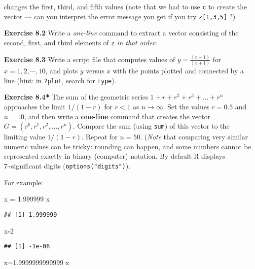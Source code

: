 \documentclass[11pt,]{article}
\newenvironment{Shaded}{\begin{snugshade}}{\end{snugshade}}
\newcommand{\DecValTok}[1]{\textcolor[rgb]{0.00,0.00,0.81}{#1}}
\newcommand{\FloatTok}[1]{\textcolor[rgb]{0.00,0.00,0.81}{#1}}
\newcommand{\StringTok}[1]{\textcolor[rgb]{0.31,0.60,0.02}{#1}}
\newcommand{\OperatorTok}[1]{\textcolor[rgb]{0.81,0.36,0.00}{\textbf{#1}}}
\newcommand{\NormalTok}[1]{#1}
\begin{document}
changes the first, third, and fifth values (note that we had to use
\texttt{c} to create the vector --- can you interpret the error message
you get if you try \texttt{z{[}1,3,5{]}} ?)

\textbf{Exercise 8.2} Write a \emph{one-line} command to extract a
vector consisting of the second, first, and third elements of \texttt{z}
\emph{in that order}.

\textbf{Exercise 8.3} Write a script file that computes values of
\(y=\frac{(x-1)}{(x+1)}\) for \(x=1,2,\cdots,10\), and plots \(y\)
versus \(x\) with the points plotted and connected by a line (hint: in
\texttt{?plot}, search for \texttt{type}).

\textbf{Exercise 8.4* } The sum of the geometric series
\(1 + r + r^2 + r^3 + ... + r^n\) approaches the limit \(1/(1-r)\) for
\(r < 1\) as \(n \rightarrow \infty\). Set the values \(r=0.5\) and
\(n=10\), and then write a \textbf{one-line} command that creates the
vector \(G = (r^0,r^1,r^2,...,r^n)\). Compare the sum (using
\texttt{sum}) of this vector to the limiting value \(1/(1-r)\). Repeat
for \(n=50\). (\emph{Note} that comparing very similar numeric values
can be tricky: rounding can happen, and some numbers cannot be
represented exactly in binary (computer) notation. By default R displays
7\textasciitilde{}significant digits (\texttt{options("digits")}).

For example:

\begin{Shaded}
\begin{Highlighting}[]
\NormalTok{x =}\StringTok{ }\FloatTok{1.999999}
\NormalTok{x}
\end{Highlighting}
\end{Shaded}

\begin{verbatim}
## [1] 1.999999
\end{verbatim}

\begin{Shaded}
\begin{Highlighting}[]
\NormalTok{x}\OperatorTok{-}\DecValTok{2}
\end{Highlighting}
\end{Shaded}

\begin{verbatim}
## [1] -1e-06
\end{verbatim}

\begin{Shaded}
\begin{Highlighting}[]
\NormalTok{x=}\FloatTok{1.9999999999999}
\NormalTok{x}
\end{Highlighting}
\end{Shaded}
\end{document}

